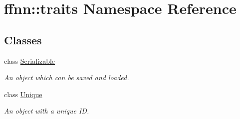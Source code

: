 \hypertarget{namespaceffnn_1_1traits}{\section{ffnn\-:\-:traits Namespace Reference}
\label{namespaceffnn_1_1traits}
}
\subsection*{Classes}
\begin{DoxyCompactItemize}
\item 
class \hyperlink{classffnn_1_1traits_1_1_serializable}{Serializable}
\begin{DoxyCompactList}\small\item\em An object which can be saved and loaded. \end{DoxyCompactList}\item 
class \hyperlink{classffnn_1_1traits_1_1_unique}{Unique}
\begin{DoxyCompactList}\small\item\em An object with a unique I\-D. \end{DoxyCompactList}\end{DoxyCompactItemize}
